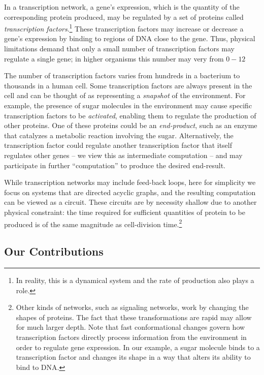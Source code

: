 In a transcription network, a gene's expression, which is the quantity of the
corresponding protein produced, may be regulated by a set of proteins called
\emph{transcription factors}.\footnote{In reality, this is a dynamical system
and the rate of production also plays a role.} These transcription factors
may increase or decrease a gene's expression by binding to regions of DNA close to
the gene. Thus, physical limitations demand that only a small number of
transcription factors may regulate a single gene; in higher organisms this
number may very from $0-12$~

The number of transcription factors varies from hundreds in a bacterium to
thousands in a human cell. Some transcription factors are always present in the
cell and can be thought of as representing a \emph{snapshot} of the environment.
For example, the presence of sugar molecules in the environment may cause specific
transcription factors to be \emph{activated}, enabling them to regulate
the production of other proteins.  One of these proteins could be an
\emph{end-product}, such as an enzyme that catalyzes a metabolic reaction
involving the sugar. Alternatively, the transcription factor could regulate
another transcription factor that itself
regulates other genes -- we view this as intermediate computation -- and may
participate in further ``computation'' to produce the desired end-result.

While transcription networks may include feed-back loops, here for simplicity we
focus on systems that are directed acyclic graphs, and the resulting computation
can be viewed as a circuit. These circuits are by necessity shallow due to
another physical constraint: the time required for sufficient quantities of
protein to be produced is of the same magnitude as cell-division
time.\footnote{Other kinds of networks, such as signaling networks, work by
changing the shapes of proteins. The fact that these transformations are rapid may
allow for much larger depth. Note that fast conformational changes govern how
transcription factors directly process information from the environment in order
to regulate gene expression.  In our example, a sugar molecule binds to a
transcription factor and changes its shape in a way that alters its ability to
bind to DNA.} 

\subsection{Our Contributions}

